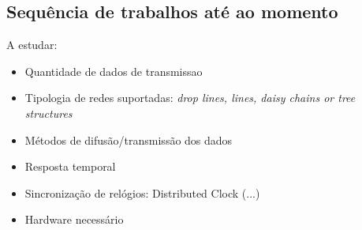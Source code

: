 \subsection{Sequência de trabalhos até ao momento}\label{sec:seq_trabalhos}
A estudar:
\begin{itemize}
\item Quantidade de dados de transmissao
\item Tipologia de redes suportadas:
    \subitem \textit{drop lines, lines, daisy chains or tree structures}
\item Métodos de difusão/transmissão dos dados
\item Resposta temporal
\item Sincronização de relógios:
    \subitem Distributed Clock
    \subitem (...)
\item Hardware necessário
\end{itemize}

